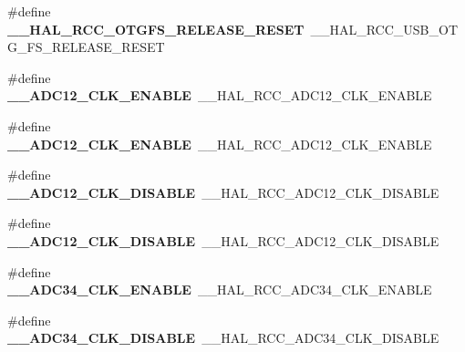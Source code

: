 \begin{DoxyCompactItemize}
\item 
\#define {\bfseries \+\_\+\+\_\+\+H\+A\+L\+\_\+\+R\+C\+C\+\_\+\+O\+T\+G\+F\+S\+\_\+\+R\+E\+L\+E\+A\+S\+E\+\_\+\+R\+E\+S\+ET}~\+\_\+\+\_\+\+H\+A\+L\+\_\+\+R\+C\+C\+\_\+\+U\+S\+B\+\_\+\+O\+T\+G\+\_\+\+F\+S\+\_\+\+R\+E\+L\+E\+A\+S\+E\+\_\+\+R\+E\+S\+ET\hypertarget{group___h_a_l___r_c_c___aliased_gaaa8e6b2c2a37901c0312f877f5845c3d}{}\label{group___h_a_l___r_c_c___aliased_gaaa8e6b2c2a37901c0312f877f5845c3d}

\item 
\#define {\bfseries \+\_\+\+\_\+\+A\+D\+C12\+\_\+\+C\+L\+K\+\_\+\+E\+N\+A\+B\+LE}~\+\_\+\+\_\+\+H\+A\+L\+\_\+\+R\+C\+C\+\_\+\+A\+D\+C12\+\_\+\+C\+L\+K\+\_\+\+E\+N\+A\+B\+LE\hypertarget{group___h_a_l___r_c_c___aliased_ga122c5ade42bf95733284ef8204a4506b}{}\label{group___h_a_l___r_c_c___aliased_ga122c5ade42bf95733284ef8204a4506b}

\item 
\#define {\bfseries \+\_\+\+\_\+\+A\+D\+C12\+\_\+\+C\+L\+K\+\_\+\+E\+N\+A\+B\+LE}~\+\_\+\+\_\+\+H\+A\+L\+\_\+\+R\+C\+C\+\_\+\+A\+D\+C12\+\_\+\+C\+L\+K\+\_\+\+E\+N\+A\+B\+LE\hypertarget{group___h_a_l___r_c_c___aliased_ga122c5ade42bf95733284ef8204a4506b}{}\label{group___h_a_l___r_c_c___aliased_ga122c5ade42bf95733284ef8204a4506b}

\item 
\#define {\bfseries \+\_\+\+\_\+\+A\+D\+C12\+\_\+\+C\+L\+K\+\_\+\+D\+I\+S\+A\+B\+LE}~\+\_\+\+\_\+\+H\+A\+L\+\_\+\+R\+C\+C\+\_\+\+A\+D\+C12\+\_\+\+C\+L\+K\+\_\+\+D\+I\+S\+A\+B\+LE\hypertarget{group___h_a_l___r_c_c___aliased_gabe7e11fce558e2053cdb0ae751126536}{}\label{group___h_a_l___r_c_c___aliased_gabe7e11fce558e2053cdb0ae751126536}

\item 
\#define {\bfseries \+\_\+\+\_\+\+A\+D\+C12\+\_\+\+C\+L\+K\+\_\+\+D\+I\+S\+A\+B\+LE}~\+\_\+\+\_\+\+H\+A\+L\+\_\+\+R\+C\+C\+\_\+\+A\+D\+C12\+\_\+\+C\+L\+K\+\_\+\+D\+I\+S\+A\+B\+LE\hypertarget{group___h_a_l___r_c_c___aliased_gabe7e11fce558e2053cdb0ae751126536}{}\label{group___h_a_l___r_c_c___aliased_gabe7e11fce558e2053cdb0ae751126536}

\item 
\#define {\bfseries \+\_\+\+\_\+\+A\+D\+C34\+\_\+\+C\+L\+K\+\_\+\+E\+N\+A\+B\+LE}~\+\_\+\+\_\+\+H\+A\+L\+\_\+\+R\+C\+C\+\_\+\+A\+D\+C34\+\_\+\+C\+L\+K\+\_\+\+E\+N\+A\+B\+LE\hypertarget{group___h_a_l___r_c_c___aliased_gad254ae5b9760ec6cc0b9be3f542b22db}{}\label{group___h_a_l___r_c_c___aliased_gad254ae5b9760ec6cc0b9be3f542b22db}

\item 
\#define {\bfseries \+\_\+\+\_\+\+A\+D\+C34\+\_\+\+C\+L\+K\+\_\+\+D\+I\+S\+A\+B\+LE}~\+\_\+\+\_\+\+H\+A\+L\+\_\+\+R\+C\+C\+\_\+\+A\+D\+C34\+\_\+\+C\+L\+K\+\_\+\+D\+I\+S\+A\+B\+LE\hypertarget{group___h_a_l___r_c_c___aliased_ga7d658c3accc90e210938a08bb313a6be}{}\label{group___h_a_l___r_c_c___aliased_ga7d658c3accc90e210938a08bb313a6be}


\end{DoxyCompactItemize}
